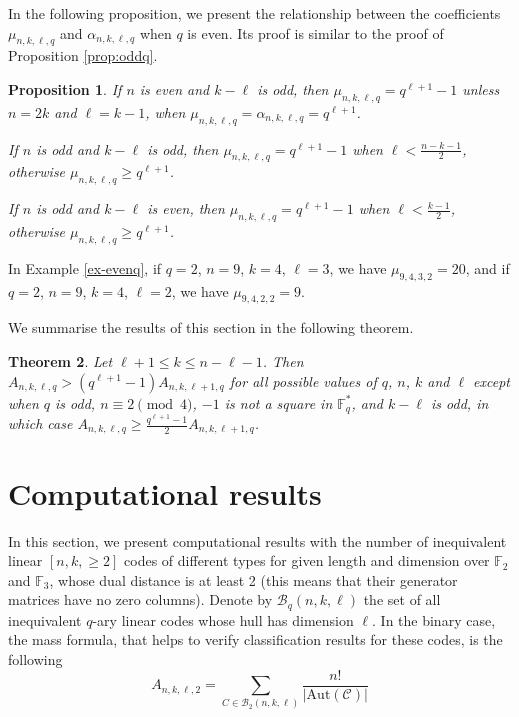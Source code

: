 \documentclass[a4paper,11pt]{article}
\newtheorem{theorem}{Theorem}
\newtheorem{proposition}[theorem]{Proposition}
\newcommand{\F}{\mathbb{F}}
\begin{document}
In the following proposition, we present the relationship between the coefficients $\mu_{n,k,\ell,q}$ and $\alpha_{n,k,\ell,q}$ when $q$ is even. Its proof is similar to the proof of Proposition \ref{prop:oddq}.

\begin{proposition}
If $n$ is even and $k-\ell$ is odd, then $\mu_{n,k,\ell,q}=q^{\ell+1}-1$ unless $n=2k$ and $\ell=k-1$, when $\mu_{n,k,\ell,q}=\alpha_{n,k,\ell,q}=q^{\ell+1}$.

If $n$ is odd and $k-\ell$ is odd, then $\mu_{n,k,\ell,q}=q^{\ell+1}-1$ when $\ell<\frac{n-k-1}{2}$, otherwise $\mu_{n,k,\ell,q}\ge q^{\ell+1}$.

If $n$ is odd and $k-\ell$ is even, then $\mu_{n,k,\ell,q}=q^{\ell+1}-1$ when $\ell<\frac{k-1}{2}$, otherwise $\mu_{n,k,\ell,q}\ge q^{\ell+1}$.
\end{proposition}

In Example \ref{ex-evenq}, if $q=2$, $n=9$, $k=4$, $\ell=3$, we have $\mu_{9,4,3,2}= 20$, and if $q=2$, $n=9$, $k=4$, $\ell=2$, we have $\mu_{9,4,2,2}= 9$.

We summarise the results of this section in the following theorem.

\begin{theorem}\label{thm:ineq}
Let $\ell+1\le k\le n-\ell-1$. Then
$A_{n,k,\ell,q}>(q^{\ell+1}-1)A_{n,k,\ell+1,q}$
for all possible values of $q$, $n$, $k$ and $\ell$ except  when $q$ is odd, $n\equiv 2\pmod 4$, $-1$ is not a square in $\F_q^*$, and $k-\ell$ is odd, in which case
$A_{n,k,\ell,q}\ge\frac{q^{\ell+1}-1}{2}A_{n,k,\ell+1,q}$.
\end{theorem}

\section{Computational results}
\label{Results}

In this section, we present computational results with the number of inequivalent linear $[n,k,\ge 2]$  codes of different types for given length and dimension over $\F_2$ and $\F_3$, whose dual distance is at least 2 (this means that their generator matrices have no zero columns). Denote by $\mathcal{B}_q(n,k,\ell)$ the set of all inequivalent $q$-ary linear codes whose hull has dimension $\ell$. In the binary case, the mass formula, that helps to verify classification results for these codes, is the following
\begin{equation}
A_{n,k,\ell,2}=\sum_{C\in \mathcal{B}_2(n,k,\ell)}\frac{n!}{|\mathrm{Aut}(\mathcal{C})|}
\end{equation}
\end{document}
